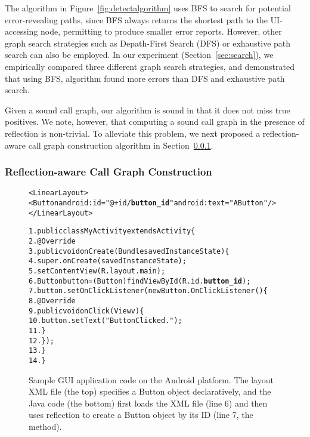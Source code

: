 The algorithm in Figure~\ref{fig:detectalgorithm} uses BFS to search
for potential error-revealing paths, since BFS always returns the
shortest path to the UI-accessing node, permitting
to produce smaller error reports. However,
other graph search strategies such as Depath-First Search (DFS) or
exhaustive path search can also be employed. In our experiment (Section~\ref{sec:search}),
we empirically compared three different graph search strategies, and demonstrated that
using BFS, algorithm found more errors than DFS and
exhaustive path search.

Given a sound call graph, our algorithm is sound in that it does not
miss true positives. We note, however, that computing a sound
call graph in the presence of reflection is non-trivial. 
To alleviate this problem, we next proposed a reflection-aware call graph
construction algorithm in Section~\ref{sec:cg}.

\subsubsection{Reflection-aware Call Graph Construction}
\label{sec:cg}

% 

\begin{figure}[t]
\begin{CodeOut}
\begin{alltt}

<LinearLayout>
    <Button android:id="@+id/\textbf{button\_id}" android:text="A Button" />
</LinearLayout>

1. public class MyActivity extends Activity \{
2.    @Override
3.    public void onCreate(Bundle savedInstanceState) \{
4.        super.onCreate(savedInstanceState);
5.        setContentView(R.layout.main);
6.        Button button = (Button) findViewById(R.id.\textbf{button\_id});
7.        button.setOnClickListener(new Button.OnClickListener() \{
8.            @Override
9.            public void onClick(View v) \{
10.               button.setText("Button Clicked.");
11.           \}
12.       \});
13.   \}
14. \}
\end{alltt}
\end{CodeOut}
\caption{Sample GUI application code on the Android platform. The layout
XML file (the top) specifies a Button object declaratively, 
and the Java code (the bottom)
first loads the XML file (line 6) and then uses reflection to create
a Button object by its ID (line 7, the  method).}
\label{fig:sampleandroid}
\end{figure}




